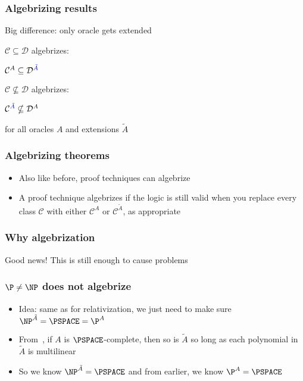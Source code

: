\documentclass[xcolor={usenames,dvipsnames}]{beamer}
\begin{document}
\begin{frame}
  \frametitle{Algebrizing results}
  Big difference: only {\color{blue}{one}} oracle gets extended
  \bigskip
  \bigskip

  \begin{minipage}[t]{0.48\linewidth}
    \begin{center}
      $\mathcal{C} \subseteq \mathcal{D}$ algebrizes:

      \bigskip
      $\mathcal{C}^{A} \subseteq \mathcal{D}^{\color{blue}{\tilde{A}}}$
    \end{center}
  \end{minipage}\hfill
  \begin{minipage}[t]{0.48\linewidth}
      $\mathcal{C} \nsubseteq \mathcal{D}$ algebrizes:

      \bigskip
      $\mathcal{C}^{\color{blue}{\tilde{A}}} \nsubseteq \mathcal{D}^{A}$
  \end{minipage}

  \bigskip
  \bigskip
  for all oracles $A$ and extensions $\tilde{A}$
\end{frame}

\begin{frame}
  \frametitle{Algebrizing theorems}
  \begin{itemize}
    \item Also like before, proof techniques can algebrize
    \item A proof technique algebrizes if the logic is still valid when you
          replace every class $\mathcal{C}$ with either $\mathcal{C}^{A}$ or $\mathcal{C}^{\tilde{A}}$, as
          appropriate
  \end{itemize}
\end{frame}

\begin{frame}
  \frametitle{Why algebrization}
  Good news! This is still enough to cause problems
\end{frame}

\begin{frame}
  \frametitle{$\P \ne \NP$ does not algebrize}
  \begin{itemize}
    \item Idea: same as for relativization, we just need to make sure
          $\NP^{\tilde{A}} = \PSPACE = \P^{A}$
    \item From~\cite{BFL90}, if $A$ is $\PSPACE$-complete, then so is
          $\tilde{A}$ so long as each polynomial in $\tilde{A}$ is multilinear

    \item So we know $\NP^{\tilde{A}} = \PSPACE$ and from earlier, we know
          $\P^{A} = \PSPACE$
  \end{itemize}
\end{frame}
\end{document}
